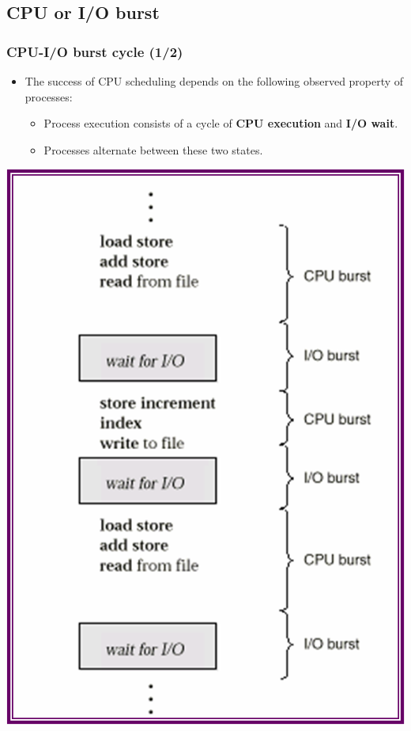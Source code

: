 \documentclass[CJKutf8,xcolor=pdftex,dvipsnames,table]{beamer}
\begin{document}
\begin{CJK*}{UTF8}{song}
  \subsection{CPU or I/O burst}

  \begin{frame}
  \frametitle{CPU-I/O burst cycle (1/2)} \pause
  \begin{minipage}[c]{0.5\textwidth}
    \begin{itemize}
    \item{The success of CPU scheduling depends on the following observed property of processes:} \pause
      \begin{itemize}
      \item{Process execution consists of a cycle of \textbf{CPU execution} and \textbf{I/O wait}.} \pause
      \item{Processes alternate between these two states.} \pause
      \end{itemize}
    \end{itemize}
  \end{minipage}%
  \begin{minipage}[c]{0.5\textwidth}
    \begin{center}
      \includegraphics[scale=0.5]{v6f6-1}
    \end{center}
  \end{minipage}
  \end{frame}
  

\end{CJK*}
\end{document}
